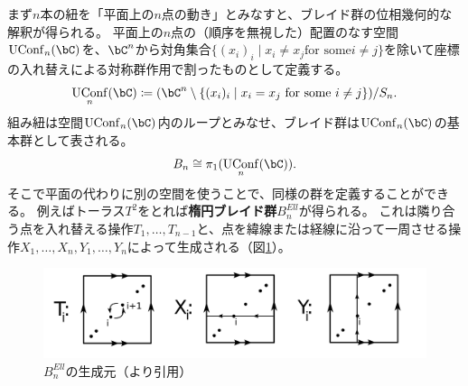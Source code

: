 \documentclass[a4j,uplatex,dvipdfmx]{jsarticle}
\numberwithin{equation}{section}
\numberwithin{figure}{section}
\theoremstyle{definition}
\DeclareMathOperator{\UConf}{UConf}
\begin{document}
まず$n$本の紐を「平面上の$n$点の動き」とみなすと、ブレイド群の位相幾何的な解釈が得られる。
平面上の$n$点の（順序を無視した）配置のなす空間$\UConf_n(\bC)$を、$\bC^n$から対角集合$\{(x_i)_i \mid x_i \neq x_j \text{for some} i \neq j\}$を除いて座標の入れ替えによる対称群作用で割ったものとして定義する。
\begin{equation}
    \UConf_n(\bC) \coloneq (\bC^n \setminus \{(x_i)_i \mid x_i = x_j \text{ for some } i \neq j\}) / S_n.
\end{equation}
組み紐は空間$\UConf_n(\bC)$内のループとみなせ、ブレイド群は$\UConf_n(\bC)$の基本群として表される。
\begin{equation}
    B_n \cong \pi_1(\UConf_n(\bC)).
\end{equation}
そこで平面の代わりに別の空間を使うことで、同様の群を定義することができる。
例えばトーラス$T^2$をとれば\textbf{楕円ブレイド群}$B^{Ell}_n$が得られる。
これは隣り合う点を入れ替える操作$T_1, \dots, T_{n-1}$と、点を緯線または経線に沿って一周させる操作$X_1, \dots, X_n, Y_1, \dots, Y_n$によって生成される（図\ref{fig:generator-for-elliptic-braid-group}）。
\begin{figure}[h]
    \includegraphics[width=150mm]{../images/elliptic_braid_group.png}
    \caption{$B^{Ell}_n$の生成元（\cite{MR2507111}より引用）}
    \label{fig:generator-for-elliptic-braid-group}
\end{figure}
\end{document}
